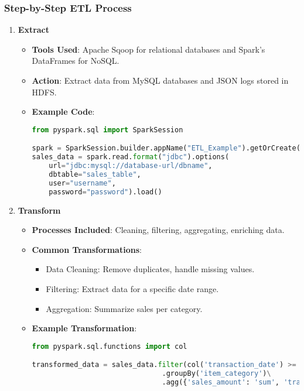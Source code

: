 \documentclass[aspectratio=169]{beamer}
\begin{document}
\begin{frame}[fragile]
    \frametitle{Step-by-Step ETL Process}
    \begin{enumerate}
        \item \textbf{Extract}
        \begin{itemize}
            \item \textbf{Tools Used}: Apache Sqoop for relational databases and Spark’s DataFrames for NoSQL.
            \item \textbf{Action}: Extract data from MySQL databases and JSON logs stored in HDFS.
            \item \textbf{Example Code}:
            \begin{lstlisting}[language=Python]
from pyspark.sql import SparkSession

spark = SparkSession.builder.appName("ETL_Example").getOrCreate()
sales_data = spark.read.format("jdbc").options(
    url="jdbc:mysql://database-url/dbname",
    dbtable="sales_table",
    user="username",
    password="password").load()
            \end{lstlisting}
        \end{itemize}

        \item \textbf{Transform}
        \begin{itemize}
            \item \textbf{Processes Included}: Cleaning, filtering, aggregating, enriching data.
            \item \textbf{Common Transformations}:
            \begin{itemize}
                \item Data Cleaning: Remove duplicates, handle missing values.
                \item Filtering: Extract data for a specific date range.
                \item Aggregation: Summarize sales per category.
            \end{itemize}
            \item \textbf{Example Transformation}:
            \begin{lstlisting}[language=Python]
from pyspark.sql.functions import col

transformed_data = sales_data.filter(col('transaction_date') >= '2022-01-01')\
                               .groupBy('item_category')\
                               .agg({'sales_amount': 'sum', 'transaction_id': 'count'})
            \end{lstlisting}
        \end{itemize}
    \end{enumerate}
\end{frame}
\end{document}
